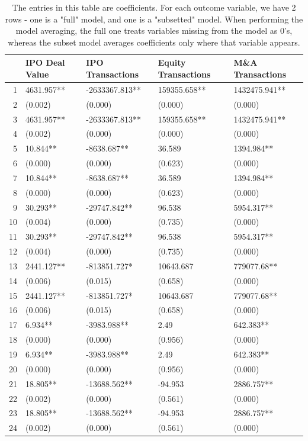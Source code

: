 \documentclass{article}
\begin{document}
\begin{table}[H]
\centering
\begin{tabular}{rllll}
  \hline
 & IPO Deal Value & IPO Transactions & Equity Transactions & M\&A Transactions \\ 
  \hline
1 & 4631.957** & -2633367.813** & 159355.658** & 1432475.941** \\ 
  2 & (0.002) & (0.000) & (0.000) & (0.000) \\ 
  3 & 4631.957** & -2633367.813** & 159355.658** & 1432475.941** \\ 
  4 & (0.002) & (0.000) & (0.000) & (0.000) \\ 
  5 & 10.844** & -8638.687** & 36.589 & 1394.984** \\ 
  6 & (0.000) & (0.000) & (0.623) & (0.000) \\ 
  7 & 10.844** & -8638.687** & 36.589 & 1394.984** \\ 
  8 & (0.000) & (0.000) & (0.623) & (0.000) \\ 
  9 & 30.293** & -29747.842** & 96.538 & 5954.317** \\ 
  10 & (0.004) & (0.000) & (0.735) & (0.000) \\ 
  11 & 30.293** & -29747.842** & 96.538 & 5954.317** \\ 
  12 & (0.004) & (0.000) & (0.735) & (0.000) \\ 
  13 & 2441.127** & -813851.727* & 10643.687 & 779077.68** \\ 
  14 & (0.006) & (0.015) & (0.658) & (0.000) \\ 
  15 & 2441.127** & -813851.727* & 10643.687 & 779077.68** \\ 
  16 & (0.006) & (0.015) & (0.658) & (0.000) \\ 
  17 & 6.934** & -3983.988** & 2.49 & 642.383** \\ 
  18 & (0.000) & (0.000) & (0.956) & (0.000) \\ 
  19 & 6.934** & -3983.988** & 2.49 & 642.383** \\ 
  20 & (0.000) & (0.000) & (0.956) & (0.000) \\ 
  21 & 18.805** & -13688.562** & -94.953 & 2886.757** \\ 
  22 & (0.002) & (0.000) & (0.561) & (0.000) \\ 
  23 & 18.805** & -13688.562** & -94.953 & 2886.757** \\ 
  24 & (0.002) & (0.000) & (0.561) & (0.000) \\ 
   \hline
\end{tabular}
\caption{The entries in this table are coefficients. For each outcome variable, 
                  we have 2 rows - one is a "full" model, and one is a "subsetted" model.
                  When performing the model averaging, the full one treats variables missing from the model as 0's,
                  whereas the subset model averages coefficients only where that variable appears.} 
\end{table}
\end{document}
